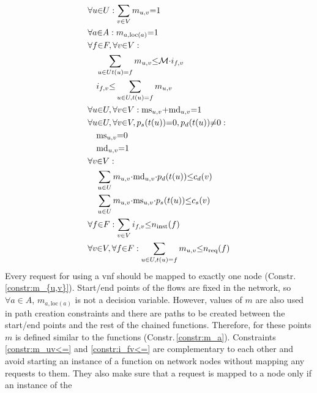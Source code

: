 \documentclass[10pt,a4paper,conference]{IEEEtran}
\begin{document}
{\footnotesize
\begin{align}
   & \forall u {\in} U : \sum_{v {\in} V} m_{u,v} {=} 1 \label{constr:m_{u,v}} \\
   & \forall a {\in} A : m_{a,\text{loc}(a)} {=} 1 \label{constr:m_a} \\
& \forall f {\in} F, \forall v {\in} V : \notag\\
   &\quad \sum_{u {\in} U  t(u) {=} f} m_{u,v} {\leq} \mathcal{M} {\cdot} i_{f,v} \label{constr:m_uv<=}  \\
   &\quad i_{f,v} {\leq} \sum_{u {\in} U, t(u) {=} f} m_{u,v} \label{constr:i_fv<=} \\
   & \forall u {\in} U, \forall v {\in} V : \text{ms}_{u,v} {+} \text{md}_{u,v} {=} 1 \label{constr:msmd} \\ 
   & \forall u {\in} U, \forall v {\in} V, p_s(t(u)) {=} 0, p_d(t(u)) {\neq} 0 : \notag\\
   &\quad \text{ms}_{u,v} {=} 0 \label{constr:ms} \\
   &\quad \text{md}_{u,v} {=} 1 \label{constr:md} \\
   & \forall v {\in} V : \notag\\
   &\quad \sum_{u {\in} U} m_{u,v} {\cdot} \text{md}_{u,v} {\cdot} p_d(t(u)) {\leq} c_d(v) \label{constr:m.md.p} \\
   &\quad \sum_{u {\in} U} m_{u,v} {\cdot} \text{ms}_{u,v} {\cdot} p_s(t(u)) {\leq} c_s(v) \label{constr:m.ms.p} \\
   & \forall f {\in} F : \sum_{v {\in} V} i_{f,v} {\leq} n_{\text{inst}}(f) \label{constr:i<=inst} \\
   & \forall v {\in} V, \forall f {\in} F : \sum_{u {\in} U, t(u) {=} f} m_{u,v} {\leq} n_{\text{req}}(f) \label{constr:m<=req} 
\end{align}
}Every request for using a \ac{vnf} should be mapped to exactly one node (Constr.\,\ref{constr:m_{u,v}}). Start/end points
of the flows are fixed in the network, so $ \forall a {\in} A $, $ m_{a,\text{loc}(a)} $
is not a decision variable. However, values of $ m $ are also used in path creation 
constraints and there are paths to be created between the start/end points and 
the rest of the chained functions. Therefore, for these points $ m $ is defined 
similar to the functions (Constr.\,\ref{constr:m_a}). Constraints \ref{constr:m_uv<=}
and \ref{constr:i_fv<=} are complementary to each other and avoid starting an
instance of a function on network nodes without mapping any requests to them. They
also make sure that a request is mapped to a node only if an instance of the 
\end{document}
